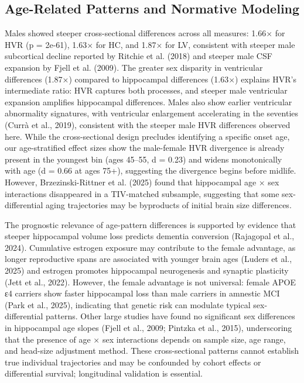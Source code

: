 \documentclass[
]{article}
\begin{document}
\subsection{Age-Related Patterns and Normative
Modeling}\label{age-related-patterns-and-normative-modeling-1}

Males showed steeper cross-sectional differences across all measures:
1.66× for HVR (p = 2e-61), 1.63× for HC, and 1.87× for LV, consistent
with steeper male subcortical decline reported by Ritchie et al. (2018)
and steeper male CSF expansion by Fjell et al. (2009). The greater sex
disparity in ventricular differences (1.87×) compared to hippocampal
differences (1.63×) explains HVR's intermediate ratio: HVR captures both
processes, and steeper male ventricular expansion amplifies hippocampal
differences. Males also show earlier ventricular abnormality signatures,
with ventricular enlargement accelerating in the seventies (Currà et
al., 2019), consistent with the steeper male HVR differences observed
here. While the cross-sectional design precludes identifying a specific
onset age, our age-stratified effect sizes show the male-female HVR
divergence is already present in the youngest bin (ages 45--55, d =
0.23) and widens monotonically with age (d = 0.66 at ages 75+),
suggesting the divergence begins before midlife. However,
Brzezinski-Rittner et al. (2025) found that hippocampal age × sex
interactions disappeared in a TIV-matched subsample, suggesting that
some sex-differential aging trajectories may be byproducts of initial
brain size differences.

The prognostic relevance of age-pattern differences is supported by
evidence that steeper hippocampal volume loss predicts dementia
conversion (Rajagopal et al., 2024). Cumulative estrogen exposure may
contribute to the female advantage, as longer reproductive spans are
associated with younger brain ages (Luders et al., 2025) and estrogen
promotes hippocampal neurogenesis and synaptic plasticity (Jett et al.,
2022). However, the female advantage is not universal: female APOE ε4
carriers show faster hippocampal loss than male carriers in amnestic MCI
(Park et al., 2025), indicating that genetic risk can modulate typical
sex-differential patterns. Other large studies have found no significant
sex differences in hippocampal age slopes (Fjell et al., 2009; Pintzka
et al., 2015), underscoring that the presence of age × sex interactions
depends on sample size, age range, and head-size adjustment method.
These cross-sectional patterns cannot establish true individual
trajectories and may be confounded by cohort effects or differential
survival; longitudinal validation is essential.
\end{document}
